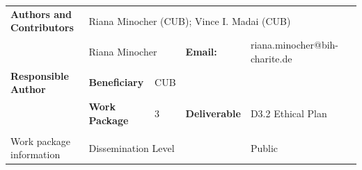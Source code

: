 \vspace{0.2cm}

\begin{table}[b]
\begin{tabular}{llllll}
\textbf{Authors and Contributors}             & \multicolumn{4}{l}{Riana Minocher (CUB); Vince I. Madai (CUB)}                                                         \\ 
                                              & \multicolumn{2}{l}{Riana Minocher} & \textbf{Email:}  &  riana.minocher@bih-charite.de  \\ 
\multirow{-2}{*}{\textbf{Responsible Author}} & \textbf{Beneficiary}              & CUB       &                  &  \\ \hline
                                              & \textbf{Work Package}   & 3   & \textbf{Deliverable}              & D3.2 Ethical Plan \\ 
                                              & \cellcolor[HTML]{D0CECE}\textbf{} & \cellcolor[HTML]{D0CECE} & \cellcolor[HTML]{D0CECE}\textbf{} & \cellcolor[HTML]{D0CECE}                                      \\
\multirow{-3}{*}{Work package information}    & \multicolumn{3}{l}{Dissemination Level}                                                          & Public                           
\end{tabular}
\end{table}